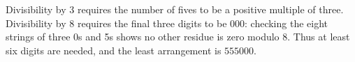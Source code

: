 Divisibility by 3 requires the number of fives to be a positive multiple of three. Divisibility by 8 requires the final three digits to be 000: checking the eight strings of three 0s and 5s shows no other residue is zero modulo 8. Thus at least six digits are needed, and the least arrangement is $\boxed{555000}$.
